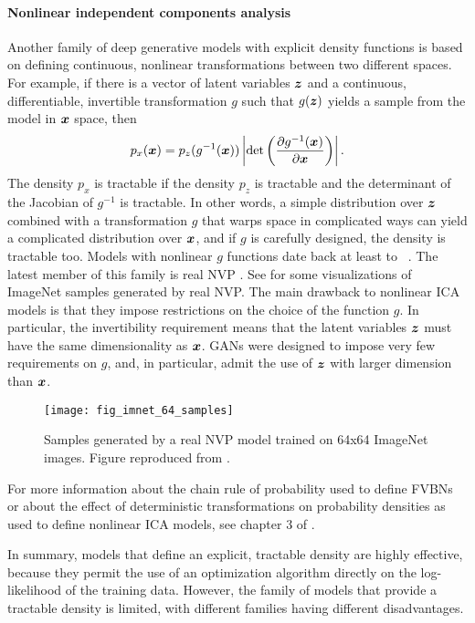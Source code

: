\paragraph{Nonlinear independent components analysis}
Another family of deep generative models with explicit density functions is based on
defining continuous, nonlinear transformations between two different spaces.
For example, if there is a vector of latent variables ${\bm{z}}$ and a continuous, differentiable,
invertible transformation
$g$ such that $g({\bm{z}})$ yields a sample from the model in ${\bm{x}}$ space,
then
\begin{equation}
  \label{eq:change-of-variable}
  p_x({\bm{x}}) = p_z(g^{-1}({\bm{x}})) \left| \mathrm{det}
  \left( \frac{\partial g^{-1}({\bm{x}})} {\partial {\bm{x}}}\right) \right|. 
\end{equation}
The density $p_x$ is tractable if the density $p_z$ is tractable
and the determinant of the Jacobian of $g^{-1}$ is tractable.
In other words, a simple distribution over ${\bm{z}}$ combined with
a transformation $g$ that warps space in complicated ways can yield
a complicated distribution over ${\bm{x}}$, and if $g$ is carefully designed,
the density is tractable too.
Models with nonlinear $g$ functions date back at least to
~\citet{deco1995higher}.
The latest member of this family is real NVP \citep{dinh2016density}.
See  for some visualizations of ImageNet samples
generated by real NVP.
The main drawback to nonlinear ICA models is that they impose restrictions
on the choice of the function $g$. In particular, the invertibility requirement
means that the latent variables ${\bm{z}}$ must have the same dimensionality as ${\bm{x}}$.
GANs were designed to impose very few requirements on $g$, and, in particular,
admit the use of ${\bm{z}}$ with larger dimension than ${\bm{x}}$.

\begin{figure}
\centering
\texttt{[image: fig\_imnet\_64\_samples]}
\caption{Samples generated by a real NVP model trained on 64x64 ImageNet images.
Figure reproduced from \citet{dinh2016density}.}
\label{fig:nvp}
\end{figure}

For more information about the chain rule of probability used to define FVBNs
or about the effect of deterministic transformations on probability densities
as used to define nonlinear ICA models, see chapter 3 of \citet{Goodfellow-et-al-2016}.

In summary, models that define an explicit, tractable density are highly
effective, because they permit the use of an optimization algorithm directly
on the log-likelihood of the training data.
However, the family of models that provide a tractable density is limited,
with different families having different disadvantages.

